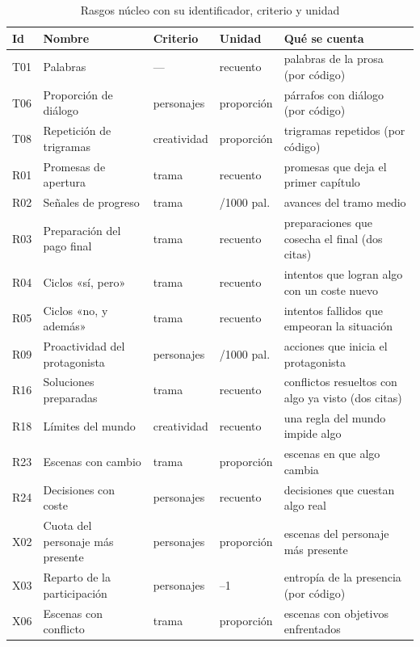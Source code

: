 \begin{table}[p]
  \centering
  \caption{Rasgos núcleo con su identificador, criterio y unidad}
  \label{tab:anexo-nucleo}
  \footnotesize
  \setlength{\tabcolsep}{4pt}
  \begin{tabular}{@{}l>{\raggedright\arraybackslash}p{3.5cm}>{\raggedright\arraybackslash}p{1.8cm}%
      >{\raggedright\arraybackslash}p{1.7cm}>{\raggedright\arraybackslash}p{6.3cm}@{}}
    \toprule
    Id & Nombre & Criterio & Unidad & Qué se cuenta \\
    \midrule
    T01 & Palabras & --- & recuento & palabras de la prosa (por código) \\
    T06 & Proporción de diálogo & personajes & proporción & párrafos con diálogo (por código) \\
    T08 & Repetición de trigramas & creatividad & proporción & trigramas repetidos (por código) \\
    R01 & Promesas de apertura & trama & recuento & promesas que deja el primer capítulo \\
    R02 & Señales de progreso & trama & /1000 pal. & avances del tramo medio \\
    R03 & Preparación del pago final & trama & recuento & preparaciones que cosecha el final (dos citas) \\
    R04 & Ciclos «sí, pero» & trama & recuento & intentos que logran algo con un coste nuevo \\
    R05 & Ciclos «no, y además» & trama & recuento & intentos fallidos que empeoran la situación \\
    R09 & Proactividad del protagonista & personajes & /1000 pal. & acciones que inicia el protagonista \\
    R16 & Soluciones preparadas & trama & recuento & conflictos resueltos con algo ya visto (dos citas) \\
    R18 & Límites del mundo & creatividad & recuento & una regla del mundo impide algo \\
    R23 & Escenas con cambio & trama & proporción & escenas en que algo cambia \\
    R24 & Decisiones con coste & personajes & recuento & decisiones que cuestan algo real \\
    X02 & Cuota del personaje más presente & personajes & proporción & escenas del personaje más presente \\
    X03 & Reparto de la participación & personajes & 0--1 & entropía de la presencia (por código) \\
    X06 & Escenas con conflicto & trama & proporción & escenas con objetivos enfrentados \\

\end{tabular}
\end{table}
